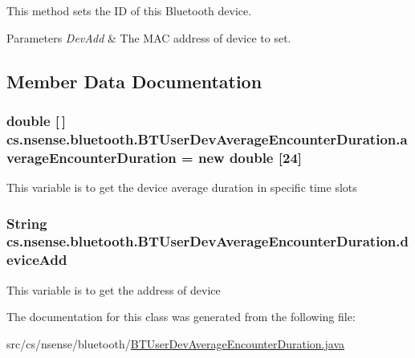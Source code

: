 This method sets the I\-D of this Bluetooth device. 
\begin{DoxyParams}{Parameters}
{\em Dev\-Add} & The M\-A\-C address of device to set. \\
\hline
\end{DoxyParams}


\subsection{Member Data Documentation}
\hypertarget{classcs_1_1nsense_1_1bluetooth_1_1_b_t_user_dev_average_encounter_duration_a7104edf8ee60767ca5637105fab2882d}{
\subsubsection[{average\-Encounter\-Duration}]{\setlength{\rightskip}{0pt plus 5cm}double \mbox{[}$\,$\mbox{]} cs.\-nsense.\-bluetooth.\-B\-T\-User\-Dev\-Average\-Encounter\-Duration.\-average\-Encounter\-Duration = new double \mbox{[}24\mbox{]}\hspace{0.3cm}{\ttfamily [private]}}}\label{classcs_1_1nsense_1_1bluetooth_1_1_b_t_user_dev_average_encounter_duration_a7104edf8ee60767ca5637105fab2882d}
This variable is to get the device average duration in specific time slots \hypertarget{classcs_1_1nsense_1_1bluetooth_1_1_b_t_user_dev_average_encounter_duration_a305c3c34715193b2ca317cc953c29adf}{
\subsubsection[{device\-Add}]{\setlength{\rightskip}{0pt plus 5cm}String cs.\-nsense.\-bluetooth.\-B\-T\-User\-Dev\-Average\-Encounter\-Duration.\-device\-Add\hspace{0.3cm}{\ttfamily [private]}}}\label{classcs_1_1nsense_1_1bluetooth_1_1_b_t_user_dev_average_encounter_duration_a305c3c34715193b2ca317cc953c29adf}
This variable is to get the address of device 

The documentation for this class was generated from the following file\-:\begin{DoxyCompactItemize}
\item 
src/cs/nsense/bluetooth/\hyperlink{_b_t_user_dev_average_encounter_duration_8java}{B\-T\-User\-Dev\-Average\-Encounter\-Duration.\-java}\end{DoxyCompactItemize}
